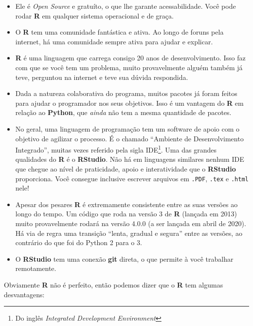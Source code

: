 \documentclass[
]{article}
\providecommand{\tightlist}{%
  \setlength{\itemsep}{0pt}\setlength{\parskip}{0pt}}
\begin{document}
\begin{itemize}
\item
  Ele é \emph{Open Source} e gratuíto, o que lhe garante acessabilidade.
  Você pode rodar \textbf{R} em qualquer sistema operacional e de graça.
\item
  O \textbf{R} tem uma comunidade fantástica e ativa. Ao longo de foruns
  pela internet, há uma comunidade sempre ativa para ajudar e explicar.
\item
  \textbf{R} é uma linguagem que carrega consigo 20 anos de
  desenvolvimento. Isso faz com que se você tem um problema, muito
  provavelmente alguém também já teve, perguntou na internet e teve sua
  dúvida respondida.
\item
  Dada a natureza colaborativa do programa, muitos pacotes já foram
  feitos para ajudar o programador nos seus objetivos. Isso é um
  vantagem do \textbf{R} em relação ao \textbf{Python}, que \emph{ainda}
  não tem a mesma quantidade de pacotes.
\item
  No geral, uma linguagem de programação tem um software de apoio com o
  objetivo de agilizar o processo. É o chamado ``Ambiente de
  Desenvolvimento Integrado'', muitas vezes referido pela sigla
  IDE\footnote{Do inglês \emph{Integrated Development Environment}}. Uma
  das grandes qualidades do \textbf{R} é o \textbf{RStudio}. Não há em
  linguagens similares nenhum IDE que chegue ao nível de praticidade,
  apoio e interatividade que o \textbf{RStudio} proporciona. Você
  consegue inclusive escrever arquivos em \texttt{.PDF}, \texttt{.tex} e
  \texttt{.html} nele!
\item
  Apesar dos pesares \textbf{R} é extremamente consistente entre as suas
  versões ao longo do tempo. Um código que roda na versão 3 de
  \textbf{R} (lançada em 2013) muito provavelmente rodará na versão
  4.0.0 (a ser lançada em abril de 2020). Há via de regra uma transição
  ``lenta, gradual e segura'' entre as versões, ao contrário do que foi
  do Python 2 para o 3.
\end{itemize}

\begin{itemize}
\tightlist
\item
  O \textbf{RStudio} tem uma conexão \textbf{git} direta, o que permite
  à você trabalhar remotamente.
\end{itemize}

Obviamente \textbf{R} não é perfeito, então podemos dizer que o
\textbf{R} tem algumas desvantagens:
\end{document}
